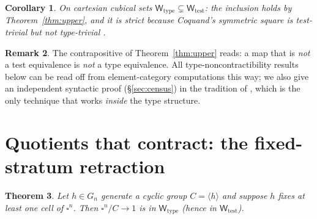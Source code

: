 \documentclass[11pt]{amsart}
\newtheorem{thm}{Theorem}[section]
\newtheorem{cor}[thm]{Corollary}
\theoremstyle{definition}
\newtheorem{rem}[thm]{Remark}
\newcommand{\Wtest}{\mathsf{W}_{\mathrm{test}}}
\newcommand{\Wtype}{\mathsf{W}_{\mathrm{type}}}
\begin{document}
\begin{cor}
  \label{cor:cartesian}
  On cartesian cubical sets $\Wtype \subsetneq \Wtest$: the
  inclusion holds by Theorem~\ref{thm:upper}, and it is strict
  because Coquand's symmetric square is test-trivial
  \cite{ACCRS} but not type-trivial \cite{CoqNote}.
\end{cor}

\begin{rem}
  The contrapositive of Theorem~\ref{thm:upper} reads: a map that
  is \emph{not} a test equivalence is \emph{not} a type
  equivalence.  All type-noncontractibility results below can be
  read off from element-category computations this way; we also
  give an independent syntactic proof
  (\S\ref{sec:census}) in the tradition of \cite{CoqNote, PaperK},
  which is the only technique that works \emph{inside} the type
  structure.
\end{rem}

\section{Quotients that contract: the fixed-stratum retraction}
\label{sec:retract}

\begin{thm}
  \label{thm:retract}
  Let $h \in G_n$ generate a cyclic group $C = \langle h\rangle$
  and suppose $h$ fixes at least one cell of $\square^n$.  Then
  $\square^n/C \to 1$ is in $\Wtype$ (hence in $\Wtest$).
\end{thm}
\end{document}
